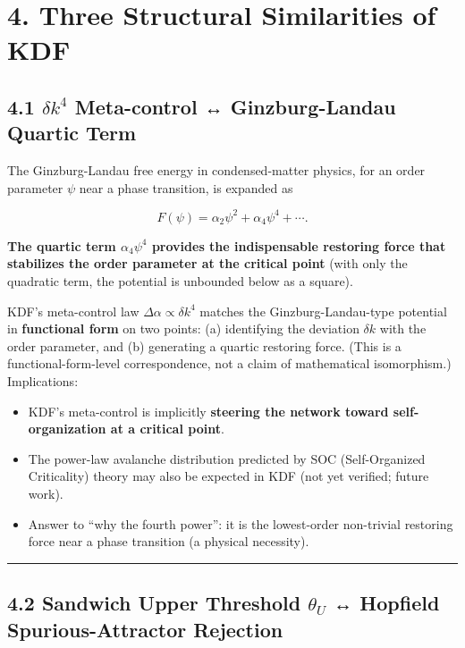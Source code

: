 \section{4. Three Structural Similarities of KDF}\label{three-structural-similarities-of-kdf}

\subsection{\texorpdfstring{4.1 \(\delta k^4\) Meta-control ↔ Ginzburg-Landau Quartic Term}{4.1 \textbackslash delta k\^{}4 Meta-control ↔ Ginzburg-Landau Quartic Term}}\label{delta-k4-meta-control-ginzburg-landau-quartic-term}

The Ginzburg-Landau free energy in condensed-matter physics, for an order parameter \(\psi\) near a phase transition, is expanded as

\[
F(\psi) = \alpha_2 \psi^2 + \alpha_4 \psi^4 + \cdots .
\]

\textbf{The quartic term \(\alpha_4 \psi^4\) provides the indispensable restoring force that stabilizes the order parameter at the critical point} (with only the quadratic term, the potential is unbounded below as a square).

KDF's meta-control law \(\Delta \alpha \propto \delta k^4\) matches the Ginzburg-Landau-type potential in \textbf{functional form} on two points: (a) identifying the deviation \(\delta k\) with the order parameter, and (b) generating a quartic restoring force. (This is a functional-form-level correspondence, not a claim of mathematical isomorphism.) Implications:

\begin{itemize}
\tightlist
\item
  KDF's meta-control is implicitly \textbf{steering the network toward self-organization at a critical point}.
\item
  The power-law avalanche distribution predicted by SOC (Self-Organized Criticality) theory may also be expected in KDF (not yet verified; future work).
\item
  Answer to ``why the fourth power'': it is the lowest-order non-trivial restoring force near a phase transition (a physical necessity).
\end{itemize}

\begin{center}\rule{0.5\linewidth}{0.5pt}\end{center}

\subsection{\texorpdfstring{4.2 Sandwich Upper Threshold \(\theta_U\) ↔ Hopfield Spurious-Attractor Rejection}{4.2 Sandwich Upper Threshold \textbackslash theta\_U ↔ Hopfield Spurious-Attractor Rejection}}\label{sandwich-upper-threshold-theta_u-hopfield-spurious-attractor-rejection}


